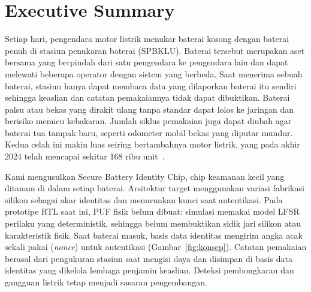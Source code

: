 \documentclass[11pt,a4paper]{article}
\begin{document}
\setcounter{page}{1}

\section{Executive Summary}

Setiap hari, pengendara motor listrik menukar baterai kosong dengan baterai penuh di stasiun penukaran baterai (SPBKLU). Baterai tersebut merupakan aset bersama yang berpindah dari satu pengendara ke pengendara lain dan dapat melewati beberapa operator dengan sistem yang berbeda. Saat menerima sebuah baterai, stasiun hanya dapat membaca data yang dilaporkan baterai itu sendiri sehingga keaslian dan catatan pemakaiannya tidak dapat dibuktikan. Baterai palsu atau bekas yang dirakit ulang tanpa standar dapat lolos ke jaringan dan berisiko memicu kebakaran. Jumlah siklus pemakaian juga dapat diubah agar baterai tua tampak baru, seperti odometer mobil bekas yang diputar mundur. Kedua celah ini makin luas seiring bertambahnya motor listrik, yang pada akhir 2024 telah mencapai sekitar 168 ribu unit~\cite{ruptl}.

Kami mengusulkan Secure Battery Identity Chip, chip keamanan kecil yang ditanam di dalam setiap baterai. Arsitektur target menggunakan variasi fabrikasi silikon sebagai akar identitas dan menurunkan kunci saat autentikasi. Pada prototipe RTL saat ini, PUF fisik belum dibuat: simulasi memakai model LFSR perilaku yang deterministik, sehingga belum membuktikan sidik jari silikon atau karakteristik fisik. Saat baterai masuk, basis data identitas mengirim angka acak sekali pakai (\emph{nonce}) untuk autentikasi (Gambar~\ref{fig:konsep}). Catatan pemakaian berasal dari pengukuran stasiun saat mengisi daya dan disimpan di basis data identitas yang dikelola lembaga penjamin keaslian. Deteksi pembongkaran dan gangguan listrik tetap menjadi sasaran pengembangan.
\end{document}
